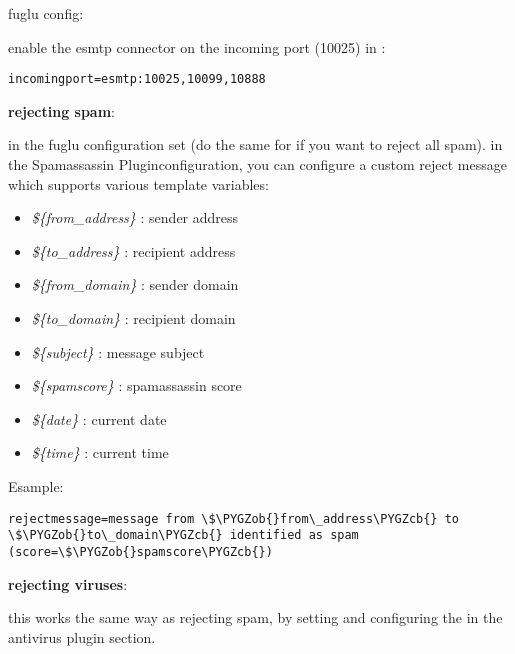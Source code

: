 \documentclass[letterpaper,10pt,english]{sphinxmanual}
\def\PYGZob{\char`\{}
\def\PYGZcb{\char`\}}
\begin{document}
fuglu config:

enable the esmtp connector on the incoming port (10025) in :

\begin{Verbatim}[commandchars=\\\{\}]
incomingport=esmtp:10025,10099,10888
\end{Verbatim}

\textbf{rejecting spam}:

in the fuglu configuration set  (do the same for  if you want to reject all spam). in the Spamassassin Pluginconfiguration, you can configure a custom reject message which supports various template variables:
\begin{itemize}
\item {} 
\emph{\$\{from\_address\}} : sender address

\item {} 
\emph{\$\{to\_address\}} : recipient address

\item {} 
\emph{\$\{from\_domain\}} : sender domain

\item {} 
\emph{\$\{to\_domain\}} : recipient domain

\item {} 
\emph{\$\{subject\}} : message subject

\item {} 
\emph{\$\{spamscore\}} : spamassassin score

\item {} 
\emph{\$\{date\}} : current date

\item {} 
\emph{\$\{time\}} : current time

\end{itemize}

Esample:

\begin{Verbatim}[commandchars=\\\{\}]
rejectmessage=message from \$\PYGZob{}from\_address\PYGZcb{} to \$\PYGZob{}to\_domain\PYGZcb{} identified as spam (score=\$\PYGZob{}spamscore\PYGZcb{})
\end{Verbatim}

\textbf{rejecting viruses}:

this works the same way as rejecting spam, by setting  and configuring the  in the antivirus plugin section.
\end{document}
